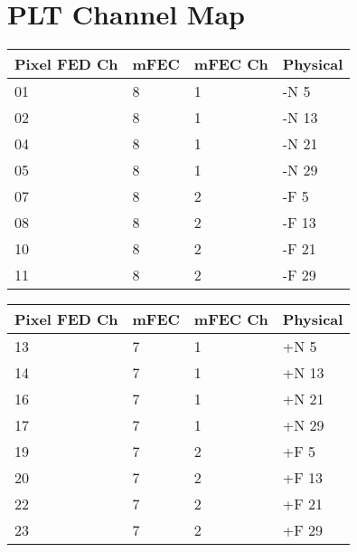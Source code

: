\section{PLT Channel Map}
 \begin{minipage}{\textwidth}
  \begin{minipage}[b]{0.49\textwidth}
    \centering
    \begin{tabular}{| p{1.5 cm} | p{1.1cm} | p{1.3cm} | p{2cm} |}
    \hline
    Pixel \newline FED Ch&  mFEC & mFEC \newline Ch & Physical \\ \hline
    01 & 8 & 1 & -N 5 \\ \hline
    02 & 8 & 1 & -N 13 \\ \hline
    04 & 8 & 1 & -N 21 \\ \hline
    05 & 8 & 1 & -N 29 \\ \hline
    07 & 8 & 2 & -F 5 \\ \hline
    08 & 8 & 2 & -F 13 \\ \hline
    10 & 8 & 2 & -F 21 \\ \hline
    11 & 8 & 2 & -F 29 \\
    \hline
    \end{tabular}
      \label{table:mZ}
  \end{minipage}
  \hfill
  \begin{minipage}[b]{0.49\textwidth}
    \centering
    \begin{tabular}{| p{1.5 cm} | p{1.1cm} | p{1.3cm} | p{2cm}|}
    \hline
    Pixel \newline FED Ch &  mFEC & mFEC \newline Ch & Physical \\ \hline
    13 & 7 & 1 & +N 5 \\ \hline
    14 & 7 & 1 & +N 13 \\ \hline
    16 & 7 & 1 & +N 21 \\ \hline
    17 & 7 & 1 & +N 29 \\ \hline
    19 & 7 & 2 & +F 5 \\ \hline
    20 & 7 & 2 & +F 13 \\ \hline
    22 & 7 & 2 & +F 21 \\ \hline
    23 & 7 & 2 & +F 29 \\
    \hline
    \end{tabular}
      \label{table:pZ}
    \end{minipage}
  \end{minipage}
  
